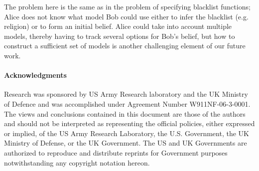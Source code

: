 \documentclass{article} %
\theoremstyle{plain} %
\theoremstyle{definition} %
\begin{document}
The problem here is the same as in the problem of specifying blacklist
functions; Alice does not know what model Bob could use either to
infer the blacklist (e.g. religion) or to form an initial belief.
Alice could take into account multiple models, thereby having to track
several options for Bob's belief, but how to construct a sufficient
set of models is another challenging element of our future work.

\ifack
\paragraph*{Acknowledgments}
\begin{small}
Research was sponsored by US Army Research laboratory and the UK
Ministry of Defence and was accomplished under Agreement Number
W911NF-06-3-0001. The views and conclusions contained in this document
are those of the authors and should not be interpreted as representing
the official policies, either expressed or implied, of the US Army
Research Laboratory, the U.S. Government, the UK Ministry of Defense,
or the UK Government. The US and UK Governments are authorized to
reproduce and distribute reprints for Government purposes
notwithstanding any copyright notation hereon.
\end{small}
\fi



\end{document}
